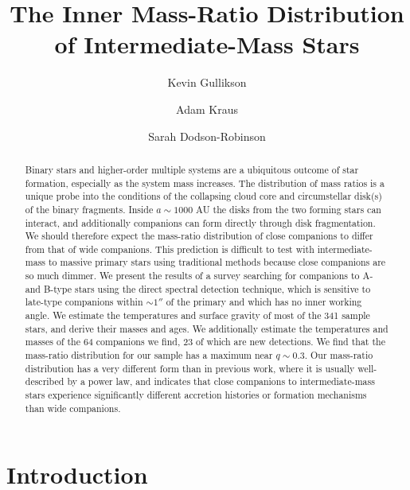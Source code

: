 \documentclass{emulateapj}
\begin{document}
\title{The Inner Mass-Ratio Distribution of Intermediate-Mass Stars}

\author{Kevin Gullikson }
\author{Adam Kraus }
\author{Sarah Dodson-Robinson }



\begin{abstract}
Binary stars and higher-order multiple systems are a ubiquitous outcome of star formation, especially as the system mass increases. The distribution of mass ratios is a unique probe into the conditions of the collapsing cloud core and circumstellar disk(s) of the binary fragments. Inside $a \sim 1000$ AU the disks from the two forming stars can interact, and additionally companions can form directly through disk fragmentation. We should therefore expect the mass-ratio distribution of close companions to differ from that of wide companions. This prediction is difficult to test with intermediate-mass to massive primary stars using traditional methods because close companions are so much dimmer. We present the results of a survey searching for companions to A- and B-type stars using the direct spectral detection technique, which is sensitive to late-type companions within $\sim 1''$ of the primary and which has no inner working angle. We estimate the temperatures and surface gravity of most of the 341 sample stars, and derive their masses and ages. We additionally estimate the temperatures and masses of the 64 companions we find, 23 of which are new detections. We find that the mass-ratio distribution for our sample has a maximum near $q \sim 0.3$. Our mass-ratio distribution has a very different form than in previous work, where it is usually well-described by a power law, and indicates that close companions to intermediate-mass stars experience significantly different accretion histories or formation mechanisms than wide companions.
\end{abstract}

\maketitle

\section{Introduction}
\end{document}
